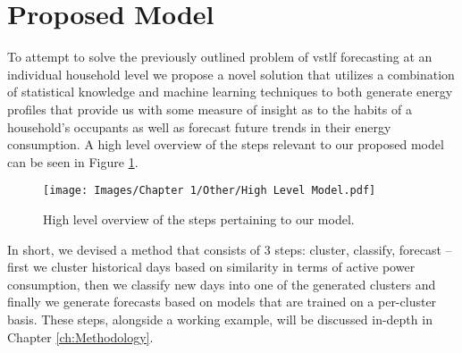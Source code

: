 \section{Proposed Model}
\label{sec:Introduction:Propose-Model}
To attempt to solve the previously outlined problem of \gls{vstlf} forecasting at an individual household level we propose a novel solution that utilizes a combination of statistical knowledge and machine learning techniques to both generate energy profiles that provide us with some measure of insight as to the habits of a household's occupants as well as forecast future trends in their energy consumption. A high level overview of the steps relevant to our proposed model can be seen in Figure \ref{fig:Proposed-Model-1}.

\null \vspace{0.5em}

\begin{figure}[H]
    \begin{adjustwidth}{-3.0cm}{-3.0cm}%
        \centering
        \texttt{[image: Images/Chapter 1/Other/High Level Model.pdf]}
        \caption{High level overview of the steps pertaining to our model.}
        \label{fig:Proposed-Model-1}
    \end{adjustwidth}
\end{figure}

\noindent \newline In short, we devised a method that consists of 3 steps: cluster, classify, forecast -- first we cluster historical days based on similarity in terms of active power consumption, then we classify new days into one of the generated clusters and finally we generate forecasts based on models that are trained on a per-cluster basis. These steps, alongside a working example, will be discussed in-depth in Chapter \ref{ch:Methodology}.